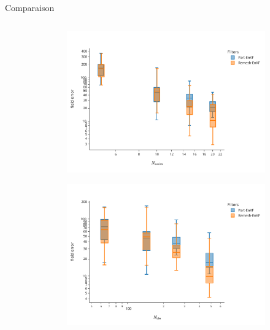 \documentclass[aspectratio=169]{beamer} %
\begin{document}
\begin{frame}{Comparaison}
\begin{columns}[t]
\begin{column}{0.33\textwidth}
        \end{column}
        \begin{column}{0.33\textwidth}
            \begin{figure}
                \begin{subfigure}{\textwidth}
                    \includegraphics[width=\textwidth]{../../conference/images/dipole_results/MSE_na_box_log_log.pdf}
                \end{subfigure}
                \begin{subfigure}{\textwidth}
                    \includegraphics[width=\textwidth]{../../conference/images/dipole_results/MSE_nobs_box_log_log.pdf}
                \end{subfigure}
            \end{figure}

\end{column}
\end{columns}
\end{frame}
\end{document}
